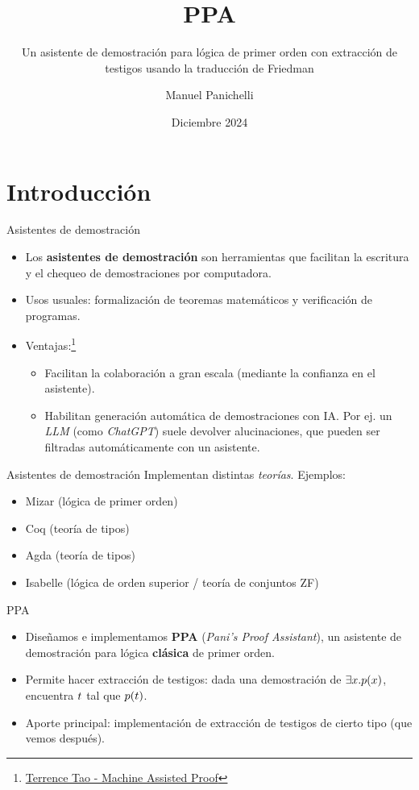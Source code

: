 \documentclass[xcolor={dvipsnames},spanish]{beamer}
\title{PPA}
\subtitle{Un asistente de demostración para
lógica de primer orden con extracción de
testigos usando la traducción de Friedman}
\author{Manuel Panichelli}
\institute{Deparatamento de Computación, FCEyN, UBA}
\date{Diciembre 2024}
\begin{document}
\frame{\titlepage}

\section{Introducción}

\begin{frame}{Asistentes de demostración}
    \begin{itemize}
        \item Los \textbf{asistentes de demostración} son herramientas que
        facilitan la escritura y el chequeo de demostraciones por
        computadora.
        \item Usos usuales: formalización de teoremas matemáticos y verificación de programas.
        \item Ventajas:\footnote{\href{https://youtu.be/AayZuuDDKP0?si=eGETzgh9PQ_8JecR}{Terrence Tao - Machine Assisted Proof}}
        \begin{itemize}
            \item Facilitan la colaboración a gran escala (mediante la confianza en el asistente).
            \item Habilitan generación automática de demostraciones con IA. Por ej. un \textit{LLM} (como \textit{ChatGPT}) suele devolver alucinaciones, que pueden ser filtradas automáticamente con un asistente.
        \end{itemize}
    \end{itemize}
\end{frame}

\begin{frame}{Asistentes de demostración}
    Implementan distintas \textit{teorías}. 
    Ejemplos:
    \begin{itemize}
        \item Mizar (lógica de primer orden)
        \item Coq (teoría de tipos)
        \item Agda (teoría de tipos)
        \item Isabelle (lógica de orden superior / teoría de conjuntos ZF)
    \end{itemize}
\end{frame}

\begin{frame}{PPA}
    \begin{itemize}
        \item Diseñamos e implementamos \textbf{PPA} (\textit{Pani's Proof
        Assistant}), un asistente de demostración para lógica \textbf{clásica}
        de primer orden.
        \item Permite hacer extracción de testigos: dada una demostración de
        $\exists x . p(x)$, encuentra $t$ tal que $p(t)$.
        \item Aporte principal: implementación de extracción de testigos de
        cierto tipo (que vemos después).
    \end{itemize}
    
\end{frame}
\end{document}
